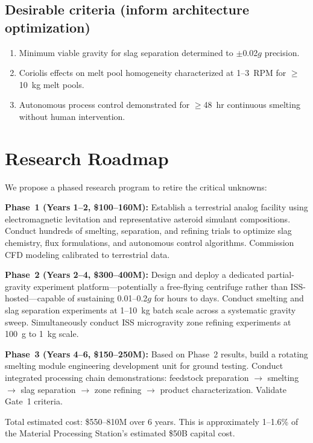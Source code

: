 \documentclass[preprint,12pt]{elsarticle}
\begin{document}
\subsection{Desirable criteria (inform architecture optimization)}

\begin{enumerate}
    \item Minimum viable gravity for slag separation determined to $\pm$0.02$g$ precision.
    \item Coriolis effects on melt pool homogeneity characterized at 1--3~RPM for $\geq$10~kg melt pools.
    \item Autonomous process control demonstrated for $\geq$48~hr continuous smelting without human intervention.
\end{enumerate}

\section{Research Roadmap}
\label{sec:roadmap}

We propose a phased research program to retire the critical unknowns:

\textbf{Phase~1 (Years 1--2, \$100--160M):} Establish a terrestrial analog facility using electromagnetic levitation and representative asteroid simulant compositions. Conduct hundreds of smelting, separation, and refining trials to optimize slag chemistry, flux formulations, and autonomous control algorithms. Commission CFD modeling calibrated to terrestrial data.

\textbf{Phase~2 (Years 2--4, \$300--400M):} Design and deploy a dedicated partial-gravity experiment platform---potentially a free-flying centrifuge rather than ISS-hosted---capable of sustaining 0.01--0.2$g$ for hours to days. Conduct smelting and slag separation experiments at 1--10~kg batch scale across a systematic gravity sweep. Simultaneously conduct ISS microgravity zone refining experiments at 100~g to 1~kg scale.

\textbf{Phase~3 (Years 4--6, \$150--250M):} Based on Phase~2 results, build a rotating smelting module engineering development unit for ground testing. Conduct integrated processing chain demonstrations: feedstock preparation $\to$ smelting $\to$ slag separation $\to$ zone refining $\to$ product characterization. Validate Gate~1 criteria.

Total estimated cost: \$550--810M over 6 years. This is approximately 1--1.6\% of the Material Processing Station's estimated \$50B capital cost.
\end{document}
